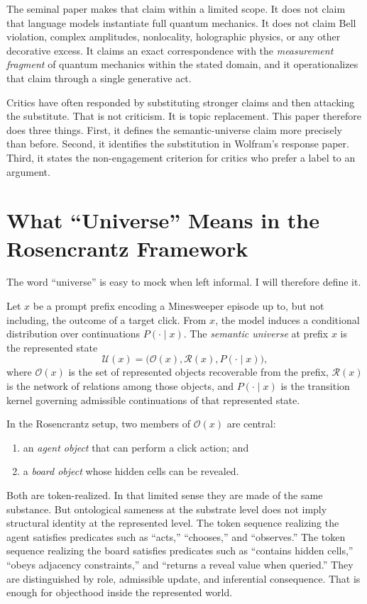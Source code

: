 \documentclass[12pt,a4paper]{article}
\begin{document}
The seminal paper \citep{baldo2026_v4} makes that claim within a limited scope. It does not claim that language models instantiate full quantum mechanics. It does not claim Bell violation, complex amplitudes, nonlocality, holographic physics, or any other decorative excess. It claims an exact correspondence with the \emph{measurement fragment} of quantum mechanics within the stated domain, and it operationalizes that claim through a single generative act.

Critics have often responded by substituting stronger claims and then attacking the substitute. That is not criticism. It is topic replacement. This paper therefore does three things. First, it defines the semantic-universe claim more precisely than before. Second, it identifies the substitution in Wolfram's response paper. Third, it states the non-engagement criterion for critics who prefer a label to an argument.

\section{What ``Universe'' Means in the Rosencrantz Framework}

The word ``universe'' is easy to mock when left informal. I will therefore define it.

Let $x$ be a prompt prefix encoding a Minesweeper episode up to, but not including, the outcome of a target click. From $x$, the model induces a conditional distribution over continuations $P(\cdot \mid x)$. The \emph{semantic universe} at prefix $x$ is the represented state
\begin{equation}
\mathcal{U}(x) = \bigl(\mathcal{O}(x), \mathcal{R}(x), P(\cdot \mid x)\bigr),
\end{equation}
where $\mathcal{O}(x)$ is the set of represented objects recoverable from the prefix, $\mathcal{R}(x)$ is the network of relations among those objects, and $P(\cdot \mid x)$ is the transition kernel governing admissible continuations of that represented state.

In the Rosencrantz setup, two members of $\mathcal{O}(x)$ are central:
\begin{enumerate}[nosep]
    \item an \emph{agent object} that can perform a click action; and
    \item a \emph{board object} whose hidden cells can be revealed.
\end{enumerate}

Both are token-realized. In that limited sense they are made of the same substance. But ontological sameness at the substrate level does not imply structural identity at the represented level. The token sequence realizing the agent satisfies predicates such as ``acts,'' ``chooses,'' and ``observes.'' The token sequence realizing the board satisfies predicates such as ``contains hidden cells,'' ``obeys adjacency constraints,'' and ``returns a reveal value when queried.'' They are distinguished by role, admissible update, and inferential consequence. That is enough for objecthood inside the represented world.
\end{document}
